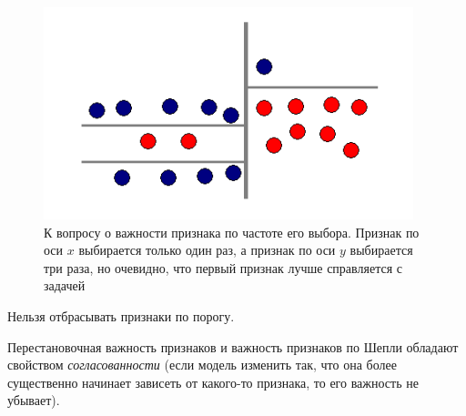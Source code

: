 \documentclass[%
	11pt,
	a4paper,
	utf8,
		]{article}
\begin{document}
\begin{figure}[h]
	\centering
	\includegraphics[scale=1.]{figures/feature_imp.png}
	\caption{ К вопросу о важности признака по частоте его выбора. Признак по оси $ x $ выбирается только один раз, а признак по оси $ y $ выбирается три раза, но очевидно, что первый признак лучше справляется с задачей }\label{fig:feature_imp}
\end{figure}

{\color{red}Нельзя отбрасывать признаки по порогу.}

Перестановочная важность признаков и важность признаков по Шепли обладают свойством \emph{согласованности} (если модель изменить так, что она более существенно начинает зависеть от какого-то признака, то его важность не убывает).
\end{document}
